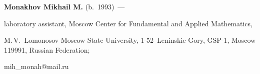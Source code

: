 \noindent


\textbf{Monakhov Mikhail M.} (b.\ 1993)~--- 


laboratory assistant, Moscow Center for Fundamental and Applied Mathematics, 


M.\,V.~Lomonosov Moscow State University, 1-52~Leninskie Gory, GSP-1, Moscow 119991, Russian Federation; 


\mbox{mih\_monah@mail.ru}








\label{end\stat}





\renewcommand{\bibname}{\protect\rm Литература}



